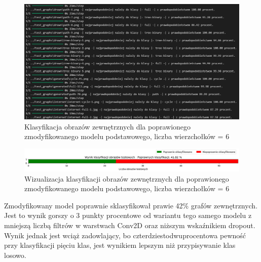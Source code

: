\begin{figure}[ht]
	\centering
	\includegraphics[width=14cm]{resources/tests/images/v4/base6_1_1_txt.png}
	\caption{Klasyfikacja obrazów zewnętrznych dla poprawionego zmodyfikowanego modelu podstawowego, liczba wierzchołków = 6}
	\label{Fig:tests-base-6b}
\end{figure}
\FloatBarrier

\begin{figure}[ht]
	\centering
	\includegraphics[width=14cm]{resources/tests/images/v4/base6_1_1_bar.png}
	\caption{Wizualizacja klasyfikacji obrazów zewnętrznych dla poprawionego zmodyfikowanego modelu podstawowego, liczba wierzchołków = 6}
	\label{Fig:tests-base-6c}
\end{figure}
\FloatBarrier

Zmodyfikowany model poprawnie sklasyfikował prawie 42\% grafów zewnętrznych.
Jest to wynik gorszy o 3 punkty procentowe od wariantu tego samego modelu
z mniejszą liczbą filtrów w warstwach Conv2D oraz niższym wskaźnikiem dropout.
Wynik jednak jest wciąż zadowlający, bo czterdziestodwuprocentowa pewność przy klasyfikacji pięciu klas,
jest wynikiem lepszym niż przypisywanie klas losowo.